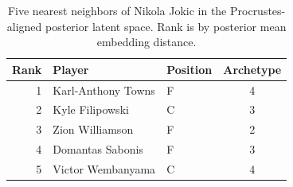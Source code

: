 \begin{table}[htbp]
  \centering\small
  \begin{tabular}{rllc}
    \toprule
    Rank & Player & Position & Archetype \\
    \midrule
    1 & Karl-Anthony Towns & F & 4 \\
    2 & Kyle Filipowski & C & 3 \\
    3 & Zion Williamson & F & 2 \\
    4 & Domantas Sabonis & F & 3 \\
    5 & Victor Wembanyama & C & 4 \\
    \bottomrule
  \end{tabular}
  \caption{Five nearest neighbors of Nikola Jokic in the Procrustes-aligned posterior latent space. Rank is by posterior mean embedding distance.}
  \label{tab:Nikola_Jokic_neighbors}
\end{table}

